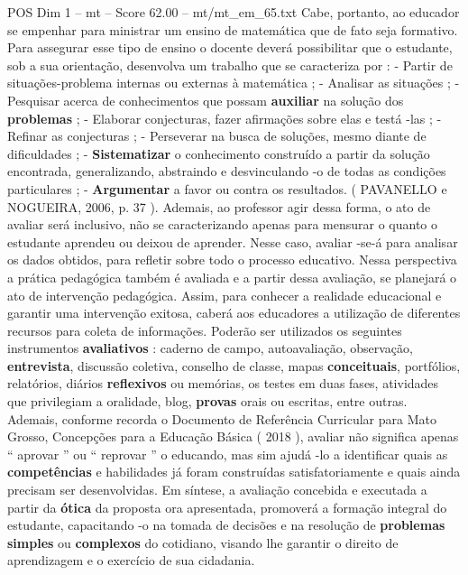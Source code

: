 \begin{textsample}{POS Dim 1 – mt – Score 62.00 – mt/mt\_em\_65.txt}
Cabe, portanto, ao educador se empenhar para ministrar um ensino de matemática que de fato seja formativo.
Para assegurar esse tipo de ensino o docente deverá possibilitar que o estudante, sob a sua orientação, desenvolva um trabalho que se caracteriza por : - Partir de situações-problema internas ou externas à matemática ; - Analisar as situações ; - Pesquisar acerca de conhecimentos que possam \textbf{auxiliar} na solução dos \textbf{problemas} ; - Elaborar conjecturas, fazer afirmações sobre elas e testá -las ; - Refinar as conjecturas ; - Perseverar na busca de soluções, mesmo diante de dificuldades ; - \textbf{Sistematizar} o conhecimento construído a partir da solução encontrada, generalizando, abstraindo e desvinculando -o de todas as condições particulares ; - \textbf{Argumentar} a favor ou contra os resultados. ( PAVANELLO e NOGUEIRA, 2006, p. 37 ).
Ademais, ao professor agir dessa forma, o ato de avaliar será inclusivo, não se caracterizando apenas para mensurar o quanto o estudante aprendeu ou deixou de aprender.
Nesse caso, avaliar -se-á para analisar os dados obtidos, para refletir sobre todo o processo educativo.
Nessa perspectiva a prática pedagógica também é avaliada e a partir dessa avaliação, se planejará o ato de intervenção pedagógica.
Assim, para conhecer a realidade educacional e garantir uma intervenção exitosa, caberá aos educadores a utilização de diferentes recursos para coleta de informações.
Poderão ser utilizados os seguintes instrumentos \textbf{avaliativos} : caderno de campo, autoavaliação, observação, \textbf{entrevista}, discussão coletiva, conselho de classe, mapas \textbf{conceituais}, portfólios, relatórios, diários \textbf{reflexivos} ou memórias, os testes em duas fases, atividades que privilegiam a oralidade, blog, \textbf{provas} orais ou escritas, entre outras.
Ademais, conforme recorda o Documento de Referência Curricular para Mato Grosso, Concepções para a Educação Básica ( 2018 ), avaliar não significa apenas “ aprovar ” ou “ reprovar ” o educando, mas sim ajudá -lo a identificar quais as \textbf{competências} e habilidades já foram construídas satisfatoriamente e quais ainda precisam ser desenvolvidas.
Em síntese, a avaliação concebida e executada a partir da \textbf{ótica} da proposta ora apresentada, promoverá a formação integral do estudante, capacitando -o na tomada de decisões e na resolução de \textbf{problemas} \textbf{simples} ou \textbf{complexos} do cotidiano, visando lhe garantir o direito de aprendizagem e o exercício de sua cidadania.

\end{textsample}
